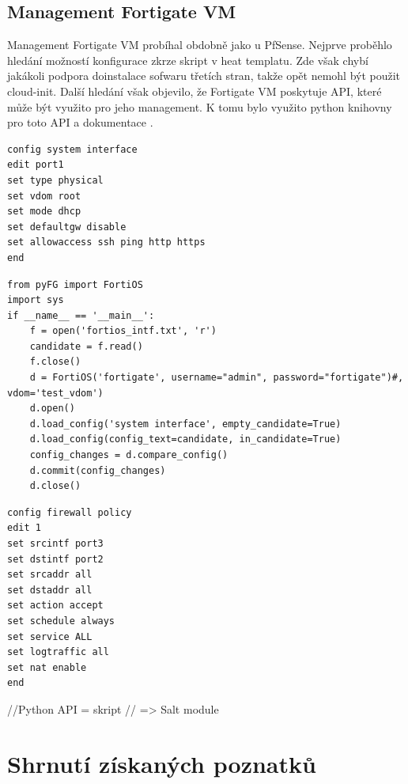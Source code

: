 \subsection{Management Fortigate VM}

Management Fortigate VM probíhal obdobně jako u PfSense. Nejprve proběhlo hledání možností konfigurace zkrze skript v heat templatu. Zde však chybí jakákoli podpora doinstalace sofwaru třetích stran, takže opět nemohl být použit cloud-init. Další hledání však objevilo, že Fortigate VM poskytuje API, které může být využito pro jeho management. K tomu bylo využito python knihovny pro toto API a dokumentace \cite{pyfg}.


\begin{lstlisting}[caption=Fortigate konfigurace pro interface]
config system interface
edit port1
set type physical
set vdom root
set mode dhcp
set defaultgw disable
set allowaccess ssh ping http https
end
\end{lstlisting}

\begin{lstlisting}[caption=Skript pro nahrání konfigurace interfaců]
from pyFG import FortiOS
import sys
if __name__ == '__main__':
    f = open('fortios_intf.txt', 'r')
    candidate = f.read()
    f.close()
    d = FortiOS('fortigate', username="admin", password="fortigate")#, vdom='test_vdom')
    d.open()
    d.load_config('system interface', empty_candidate=True)
    d.load_config(config_text=candidate, in_candidate=True)
    config_changes = d.compare_config()
    d.commit(config_changes)
    d.close()
\end{lstlisting}

\begin{lstlisting}[caption=Fortigate konfigurace pro NAT]
config firewall policy
edit 1
set srcintf port3
set dstintf port2
set srcaddr all
set dstaddr all
set action accept
set schedule always
set service ALL
set logtraffic all
set nat enable
end
\end{lstlisting}


//Python API = skript
// => Salt module 


\section{Shrnutí získaných poznatků}
